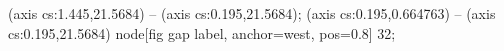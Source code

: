  (axis cs:1.445,21.5684) -- (axis cs:0.195,21.5684);
 (axis cs:0.195,0.664763) -- (axis cs:0.195,21.5684)
  node[fig gap label, anchor=west, pos=0.8] {\texttimes{}32};
